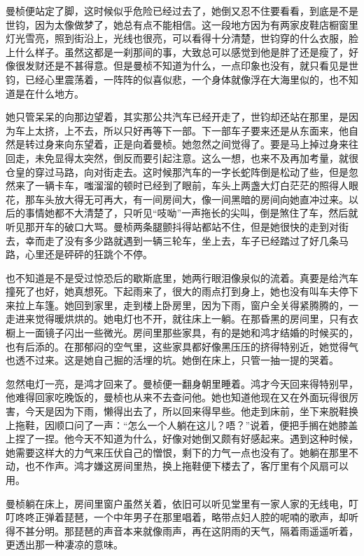 \par 曼桢便站定了脚，这时候似乎危险已经过去了，她倒又忍不住要看看，到底是不是世钧，因为太像做梦了，她总有点不能相信。这一段地方因为有两家皮鞋店橱窗里灯光雪亮，照到街沿上，光线也很亮，可以看得十分清楚，世钧穿的什么衣服，脸上什么样子。虽然这都是一刹那间的事，大致总可以感觉到他是胖了还是瘦了，好像很发财还是不甚得意。但是曼桢不知道为什么，一点印象也没有，就只看见是世钧，已经心里震荡着，一阵阵的似喜似悲，一个身体就像浮在大海里似的，也不知道是在什么地方。
\par 她只管呆呆的向那边望着，其实那公共汽车已经开走了，世钧却还站在那里，是因为车上太挤，上不去，所以只好再等下一部。下一部车子要来还是从东面来，他自然是转过身来向东望着，正是向着曼桢。她忽然之间觉得了。要是马上掉过身来往回走，未免显得太突然，倒反而要引起注意。这么一想，也来不及再加考量，就很仓皇的穿过马路，向对街走去。这时候那汽车的一字长蛇阵倒是松动了些，但是忽然来了一辆卡车，嗤溜溜的顿时已经到了眼前，车头上两盏大灯白茫茫的照得人眼花，那车头放大得无可再大，有一间房间大，像一间黑暗的房间向她直冲过来。以后的事情她都不大清楚了，只听见“吱呦”一声拖长的尖叫，倒是煞住了车，然后就听见那开车的破口大骂。曼桢两条腿颤抖得站都站不住，但是她很快的走到对街去，幸而走了没有多少路就遇到一辆三轮车，坐上去，车子已经踏过了好几条马路，心里还是砰砰的狂跳个不停。
\par 也不知道是不是受过惊恐后的歇斯底里，她两行眼泪像泉似的流着。真要是给汽车撞死了也好，她真想死。下起雨来了，很大的雨点打到身上，她也没有叫车夫停下来拉上车篷。她回到家里，走到楼上卧房里，因为下雨，窗户全关得紧腾腾的，一走进来觉得暖烘烘的。她电灯也不开，就往床上一躺。在那昏黑的房间里，只有衣橱上一面镜子闪出一些微光。房间里那些家具，有的是她和鸿才结婚的时候买的，也有后添的。在那郁闷的空气里，这些家具都好像黑压压的挤得特别近，她觉得气也透不过来。这是她自己掘的活埋的坑。她倒在床上，只管一抽一提的哭着。
\par 忽然电灯一亮，是鸿才回来了。曼桢便一翻身朝里睡着。鸿才今天回来得特别早，他难得回家吃晚饭的，曼桢也从来不去查问他。她也知道他现在又在外面玩得很厉害，今天是因为下雨，懒得出去了，所以回来得早些。他走到床前，坐下来脱鞋换上拖鞋，因顺口问了一声：“怎么一个人躺在这儿？唔？”说着，便把手搁在她膝盖上捏了一捏。他今天不知道为什么，好像对她倒又颇有好感起来。遇到这种时候，她需要这样大的力气来压伏自己的憎恨，剩下的力气一点也没有了。她躺在那里不动，也不作声。鸿才嫌这房间里热，换上拖鞋便下楼去了，客厅里有个风扇可以用。
\par 曼桢躺在床上，房间里窗户虽然关着，依旧可以听见堂里有一家人家的无线电，叮叮咚咚正弹着琵琶，一个中年男子在那里唱着，略带点妇人腔的呢喃的歌声，却听得不甚分明。那琵琶的声音本来就像雨声，再在这阴雨的天气，隔着雨遥遥听着，更透出那一种凄凉的意味。

